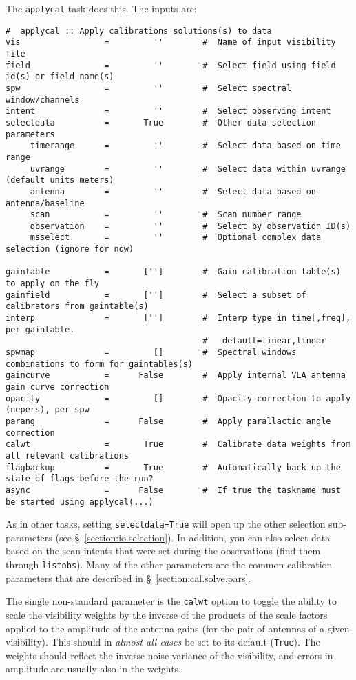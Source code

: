 {The {\tt applycal} task does this.  The inputs are:
\small
\begin{verbatim}
#  applycal :: Apply calibrations solutions(s) to data
vis                 =         ''        #  Name of input visibility file
field               =         ''        #  Select field using field id(s) or field name(s)
spw                 =         ''        #  Select spectral window/channels
intent              =         ''        #  Select observing intent
selectdata          =       True        #  Other data selection parameters
     timerange      =         ''        #  Select data based on time range
     uvrange        =         ''        #  Select data within uvrange (default units meters)
     antenna        =         ''        #  Select data based on antenna/baseline
     scan           =         ''        #  Scan number range
     observation    =         ''        #  Select by observation ID(s)
     msselect       =         ''        #  Optional complex data selection (ignore for now)

gaintable           =       ['']        #  Gain calibration table(s) to apply on the fly
gainfield           =       ['']        #  Select a subset of calibrators from gaintable(s)
interp              =       ['']        #  Interp type in time[,freq], per gaintable.
                                        #   default=linear,linear
spwmap              =         []        #  Spectral windows combinations to form for gaintables(s)
gaincurve           =      False        #  Apply internal VLA antenna gain curve correction
opacity             =         []        #  Opacity correction to apply (nepers), per spw
parang              =      False        #  Apply parallactic angle correction
calwt               =       True        #  Calibrate data weights from all relevant calibrations
flagbackup          =       True        #  Automatically back up the state of flags before the run?
async               =      False        #  If true the taskname must be started using applycal(...)
\end{verbatim}
\normalsize
As in other tasks, setting {\tt selectdata=True} will open up the
other selection sub-parameters (see
\S~\ref{section:io.selection}). In addition, you can also select data
based on the scan intents that were set during the observations (find
them through {\tt listobs}). 
Many of the other parameters are the common calibration parameters
that are described in \S~\ref{section:cal.solve.pars}.

The single non-standard parameter is the {\tt calwt} option to toggle
the ability to scale the visibility weights by the inverse of the 
products of the scale factors applied to the amplitude of the antenna
gains (for the pair of antennas of a given visibility).  
This should in {\em almost all cases} be set to its default ({\tt True}).
The weights should reflect the inverse noise variance of the
visibility, and errors in amplitude are usually also in the weights.


}
